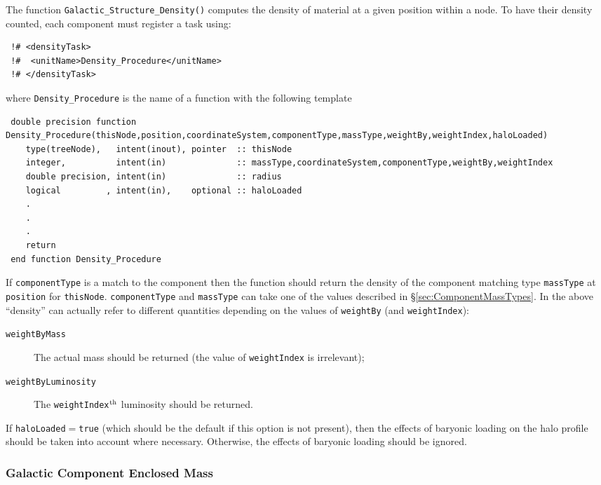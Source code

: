 The function {\tt Galactic\_Structure\_Density()} computes the density of material at a given position within a node. To have their density counted, each component must register a task using:
\begin{verbatim}
 !# <densityTask>
 !#  <unitName>Density_Procedure</unitName>
 !# </densityTask>
\end{verbatim}
where {\tt Density\_Procedure} is the name of a function with the following template
\begin{verbatim}
 double precision function Density_Procedure(thisNode,position,coordinateSystem,componentType,massType,weightBy,weightIndex,haloLoaded)
    type(treeNode),   intent(inout), pointer  :: thisNode
    integer,          intent(in)              :: massType,coordinateSystem,componentType,weightBy,weightIndex
    double precision, intent(in)              :: radius
    logical         , intent(in),    optional :: haloLoaded
    .
    .
    .
    return
 end function Density_Procedure
\end{verbatim}
If {\tt componentType} is a match to the component then the function should return the density of the component matching type {\tt massType} at {\tt position} for {\tt thisNode}. {\tt componentType} and {\tt massType} can take one of the values described in \S\ref{sec:ComponentMassTypes}. In the above ``density'' can actually refer to different quantities depending on the values of {\tt weightBy} (and {\tt weightIndex}):
\begin{description}
\item [{\tt weightByMass}] The actual mass should be returned (the value of {\tt weightIndex} is irrelevant);
\item [{\tt weightByLuminosity}] The {\tt weightIndex}$^{\rm th}$ luminosity should be returned.
\end{description}
If {\tt haloLoaded}$=${\tt true} (which should be the default if this option is not present), then the effects of baryonic loading on the halo profile should be taken into account where necessary. Otherwise, the effects of baryonic loading should be ignored.

\subsubsection{Galactic Component Enclosed Mass}


